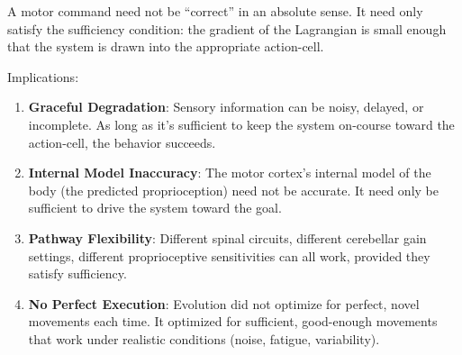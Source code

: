 \begin{principle}
\label{prin:sufficiency-motor}
A motor command need not be ``correct'' in an absolute sense. It need only satisfy the sufficiency condition: the gradient of the Lagrangian is small enough that the system is drawn into the appropriate action-cell.

Implications:
\begin{enumerate}[label=(\arabic*), noitemsep]
\item \textbf{Graceful Degradation}: Sensory information can be noisy, delayed, or incomplete. As long as it's sufficient to keep the system on-course toward the action-cell, the behavior succeeds.
\item \textbf{Internal Model Inaccuracy}: The motor cortex's internal model of the body (the predicted proprioception) need not be accurate. It need only be sufficient to drive the system toward the goal.
\item \textbf{Pathway Flexibility}: Different spinal circuits, different cerebellar gain settings, different proprioceptive sensitivities can all work, provided they satisfy sufficiency.
\item \textbf{No Perfect Execution}: Evolution did not optimize for perfect, novel movements each time. It optimized for sufficient, good-enough movements that work under realistic conditions (noise, fatigue, variability).
\end{enumerate}
\end{principle}

